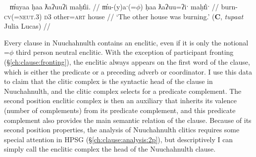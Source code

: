 \ex~ \label{ex:2padjpart}
\begingl
\glpreamble m̓uyaa ḥaa ƛaʔuuʔi maḥt̓ii. //
\gla m̓u-(y)aˑ(=$\phi$) ḥaa ƛaʔuu=ʔiˑ maḥt̓iˑ  //
\glb burn-\textsc{cv}(=\textsc{neut.3}) \textsc{d3} other=\textsc{art} house //
\glft `The other house was burning.' (\textbf{C}, \textit{tupaat} Julia Lucas) //
\endgl
\xe


Every clause in Nuuchahnulth contains an enclitic, even if it is only the notional =$\phi$ third person neutral enclitic. With the exception of participant fronting (\S\ref{ch:clause:fronting}), the enclitic always appears on the first word of the clause, which is either the predicate or a preceding adverb or coordinator. I use this data to claim that the clitic complex is the syntactic head of the clause in Nuuchahnulth, and the clitic complex selects for a predicate complement. The second position enclitic complex is then an auxiliary that inherits its valence (number of complements) from its predicate complement, and this predicate complement also provides the main semantic relation of the clause. Because of its second position properties, the analysis of Nuuchahnulth clitics requires some special attention in HPSG (\S\ref{ch:clause:analysis:2p}), but descriptively I can simply call the enclitic complex the head of the Nuuchahnulth clause.


